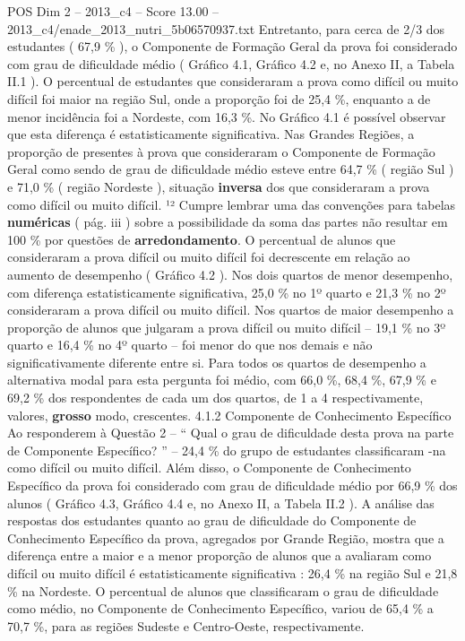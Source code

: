 \begin{textsample}{POS Dim 2 – 2013\_c4 – Score 13.00 – 2013\_c4/enade\_2013\_nutri\_5b06570937.txt}
Entretanto, para cerca de 2/3 dos estudantes ( 67,9 \% ), o Componente de Formação Geral da prova foi considerado com grau de dificuldade médio ( Gráfico 4.1, Gráfico 4.2 e, no Anexo II, a Tabela II.1 ).
O percentual de estudantes que consideraram a prova como difícil ou muito difícil foi maior na região Sul, onde a proporção foi de 25,4 \%, enquanto a de menor incidência foi a Nordeste, com 16,3 \%.
No Gráfico 4.1 é possível observar que esta diferença é estatisticamente significativa.
Nas Grandes Regiões, a proporção de presentes à prova que consideraram o Componente de Formação Geral como sendo de grau de dificuldade médio esteve entre 64,7 \% ( região Sul ) e 71,0 \% ( região Nordeste ), situação \textbf{inversa} dos que consideraram a prova como difícil ou muito difícil. ¹² Cumpre lembrar uma das convenções para tabelas \textbf{numéricas} ( pág. iii ) sobre a possibilidade da soma das partes não resultar em 100 \% por questões de \textbf{arredondamento}.
O percentual de alunos que consideraram a prova difícil ou muito difícil foi decrescente em relação ao aumento de desempenho ( Gráfico 4.2 ).
Nos dois quartos de menor desempenho, com diferença estatisticamente significativa, 25,0 \% no 1º quarto e 21,3 \% no 2º consideraram a prova difícil ou muito difícil.
Nos quartos de maior desempenho a proporção de alunos que julgaram a prova difícil ou muito difícil – 19,1 \% no 3º quarto e 16,4 \% no 4º quarto – foi menor do que nos demais e não significativamente diferente entre si.
Para todos os quartos de desempenho a alternativa modal para esta pergunta foi médio, com 66,0 \%, 68,4 \%, 67,9 \% e 69,2 \% dos respondentes de cada um dos quartos, de 1 a 4 respectivamente, valores, \textbf{grosso} modo, crescentes. 4.1.2 Componente de Conhecimento Específico Ao responderem à Questão 2 – “ Qual o grau de dificuldade desta prova na parte de Componente Específico? ” – 24,4 \% do grupo de estudantes classificaram -na como difícil ou muito difícil.
Além disso, o Componente de Conhecimento Específico da prova foi considerado com grau de dificuldade médio por 66,9 \% dos alunos ( Gráfico 4.3, Gráfico 4.4 e, no Anexo II, a Tabela II.2 ).
A análise das respostas dos estudantes quanto ao grau de dificuldade do Componente de Conhecimento Específico da prova, agregados por Grande Região, mostra que a diferença entre a maior e a menor proporção de alunos que a avaliaram como difícil ou muito difícil é estatisticamente significativa : 26,4 \% na região Sul e 21,8 \% na Nordeste.
O percentual de alunos que classificaram o grau de dificuldade como médio, no Componente de Conhecimento Específico, variou de 65,4 \% a 70,7 \%, para as regiões Sudeste e Centro-Oeste, respectivamente.

\end{textsample}
